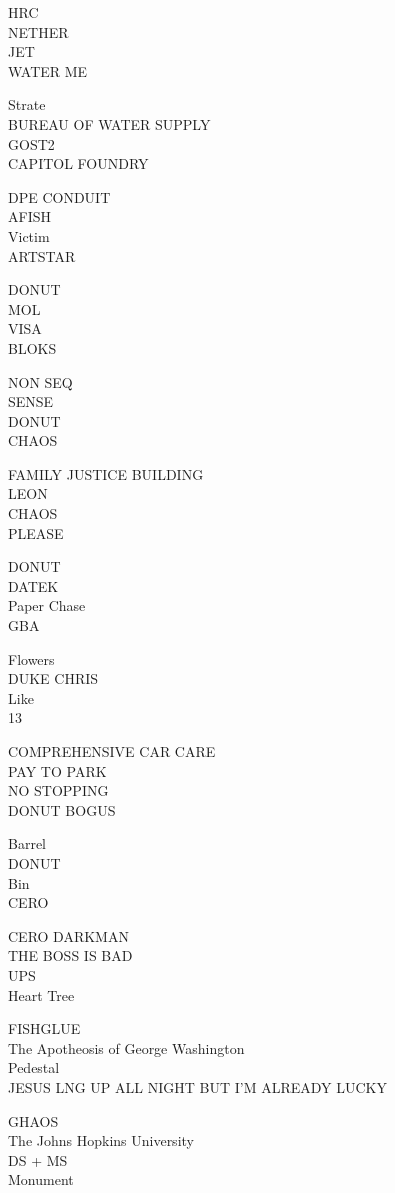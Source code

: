 \documentclass[10pt,letterpaper]{article}
\begin{document}
HRC\\
NETHER\\
JET\\
WATER ME

Strate\\
BUREAU OF WATER SUPPLY\\
GOST2\\
CAPITOL FOUNDRY

DPE CONDUIT\\
AFISH\\
Victim\\
ARTSTAR

DONUT\\
MOL\\
VISA\\
BLOKS

NON SEQ\\
SENSE\\
DONUT\\
CHAOS

FAMILY JUSTICE BUILDING\\
LEON\\
CHAOS\\
PLEASE

DONUT\\
DATEK\\
Paper Chase\\
GBA

Flowers\\
DUKE CHRIS\\
Like\\
13

COMPREHENSIVE CAR CARE\\
PAY TO PARK\\
NO STOPPING\\
DONUT BOGUS

Barrel\\
DONUT\\
Bin\\
CERO

CERO DARKMAN\\
THE BOSS IS BAD\\
UPS\\
Heart Tree

FISHGLUE\\
The Apotheosis of George Washington\\
Pedestal\\
JESUS LNG UP ALL NIGHT BUT I'M ALREADY LUCKY

GHAOS\\
The Johns Hopkins University\\
DS + MS\\
Monument
\end{document}
